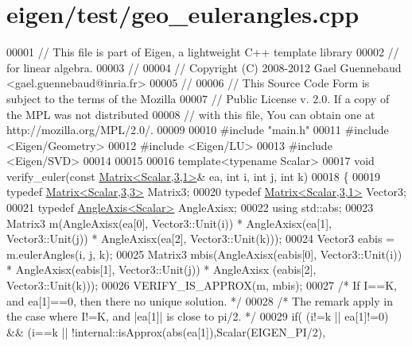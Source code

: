 \hypertarget{eigen_2test_2geo__eulerangles_8cpp_source}{}\section{eigen/test/geo\+\_\+eulerangles.cpp}
\label{eigen_2test_2geo__eulerangles_8cpp_source}

\begin{DoxyCode}
00001 \textcolor{comment}{// This file is part of Eigen, a lightweight C++ template library}
00002 \textcolor{comment}{// for linear algebra.}
00003 \textcolor{comment}{//}
00004 \textcolor{comment}{// Copyright (C) 2008-2012 Gael Guennebaud <gael.guennebaud@inria.fr>}
00005 \textcolor{comment}{//}
00006 \textcolor{comment}{// This Source Code Form is subject to the terms of the Mozilla}
00007 \textcolor{comment}{// Public License v. 2.0. If a copy of the MPL was not distributed}
00008 \textcolor{comment}{// with this file, You can obtain one at http://mozilla.org/MPL/2.0/.}
00009 
00010 \textcolor{preprocessor}{#include "main.h"}
00011 \textcolor{preprocessor}{#include <Eigen/Geometry>}
00012 \textcolor{preprocessor}{#include <Eigen/LU>}
00013 \textcolor{preprocessor}{#include <Eigen/SVD>}
00014 
00015 
00016 \textcolor{keyword}{template}<\textcolor{keyword}{typename} Scalar>
00017 \textcolor{keywordtype}{void} verify\_euler(\textcolor{keyword}{const} \hyperlink{group___core___module}{Matrix<Scalar,3,1>}& ea, \textcolor{keywordtype}{int} i, \textcolor{keywordtype}{int} j, \textcolor{keywordtype}{int} k)
00018 \{
00019   \textcolor{keyword}{typedef} \hyperlink{group___core___module_class_eigen_1_1_matrix}{Matrix<Scalar,3,3>} Matrix3;
00020   \textcolor{keyword}{typedef} \hyperlink{group___core___module}{Matrix<Scalar,3,1>} Vector3;
00021   \textcolor{keyword}{typedef} \hyperlink{group___geometry___module_class_eigen_1_1_angle_axis}{AngleAxis<Scalar>} AngleAxisx;
00022   \textcolor{keyword}{using} std::abs;
00023   Matrix3 m(AngleAxisx(ea[0], Vector3::Unit(i)) * AngleAxisx(ea[1], Vector3::Unit(j)) * AngleAxisx(ea[2], 
      Vector3::Unit(k)));
00024   Vector3 eabis = m.eulerAngles(i, j, k);
00025   Matrix3 mbis(AngleAxisx(eabis[0], Vector3::Unit(i)) * AngleAxisx(eabis[1], Vector3::Unit(j)) * AngleAxisx
      (eabis[2], Vector3::Unit(k))); 
00026   VERIFY\_IS\_APPROX(m,  mbis); 
00027   \textcolor{comment}{/* If I==K, and ea[1]==0, then there no unique solution. */} 
00028   \textcolor{comment}{/* The remark apply in the case where I!=K, and |ea[1]| is close to pi/2. */} 
00029   \textcolor{keywordflow}{if}( (i!=k || ea[1]!=0) && (i==k || !internal::isApprox(abs(ea[1]),Scalar(EIGEN\_PI/2),

\end{DoxyCode}
